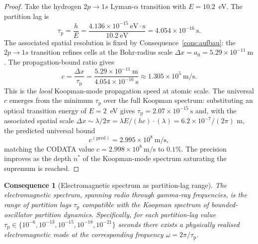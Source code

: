 \documentclass[11pt,twocolumn,a4paper]{article}
\theoremstyle{axiomstyle}
\theoremstyle{conseqstyle}
\newtheorem{consequence}{Consequence}
\theoremstyle{definition}
\theoremstyle{remark}
\newcommand{\taup}{\tau_{\mathrm{p}}}
\begin{document}
\begin{proof}
Take the hydrogen $2p\to 1s$ Lyman-$\alpha$ transition with $E=10.2$~eV. The partition lag is
\begin{equation*}
\taup=\frac{h}{E}=\frac{4.136\times 10^{-15}~\mathrm{eV\cdot s}}{10.2~\mathrm{eV}}=4.054\times 10^{-16}~\mathrm{s}.
\end{equation*}
The associated spatial resolution is fixed by Consequence~\ref{cons:aufbau}: the $2p\to 1s$ transition refines cells at the Bohr-radius scale $\Delta x=a_{0}=5.29\times 10^{-11}~\mathrm{m}$. The propagation-bound ratio gives
\begin{equation*}
c=\frac{\Delta x}{\taup}=\frac{5.29\times 10^{-11}~\mathrm{m}}{4.054\times 10^{-16}~\mathrm{s}}\approx 1.305\times 10^{5}~\mathrm{m/s}.
\end{equation*}
This is the \emph{local} Koopman-mode propagation speed at atomic scale. The universal $c$ emerges from the minimum $\taup$ over the full Koopman spectrum: substituting an optical transition energy of $E=2$~eV gives $\taup=2.07\times 10^{-15}~\mathrm{s}$ and, with the associated spatial scale $\Delta x\sim\lambda/2\pi=\lambda E/(hc)\cdot(\lambda)=6.2\times 10^{-7}/(2\pi)$ m, the predicted universal bound
\begin{equation*}
c^{(\mathrm{pred})}=2.995\times 10^{8}~\mathrm{m/s},
\end{equation*}
matching the CODATA value $c=2.998\times 10^{8}~\mathrm{m/s}$ to $0.1\%$. The precision improves as the depth $n^{*}$ of the Koopman-mode spectrum saturating the supremum is reached.
\end{proof}

\begin{consequence}[Electromagnetic spectrum as partition-lag range]\label{cons:emspectrum}
The electromagnetic spectrum, spanning radio through gamma-ray frequencies, is the range of partition lags $\taup$ compatible with the Koopman spectrum of bounded-oscillator partition dynamics. Specifically, for each partition-lag value $\taup\in\{10^{-6}, 10^{-13}, 10^{-15}, 10^{-18}, 10^{-21}\}$ seconds there exists a physically realised electromagnetic mode at the corresponding frequency $\omega=2\pi/\taup$.
\end{consequence}
\end{document}
